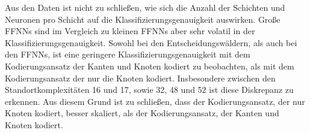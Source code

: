 Aus den Daten ist nicht zu schließen, wie sich die Anzahl der Schichten und Neuronen pro Schicht auf die Klassifizierungsgenauigkeit auswirken.
Große FFNNs sind im Vergleich zu kleinen FFNNs aber sehr volatil in der Klassifizierungsgenauigkeit.
\newline
\newline
Sowohl bei den Entscheidungswäldern, als auch bei den FFNNs, ist eine geringere Klassifizierungsgenauigkeit mit dem Kodierungsansatz der Kanten und Knoten kodiert
zu beobachten, als mit dem Kodierungsansatz der nur die Knoten kodiert.
Insbesondere zwischen den Standortkomplexitäten 16 und 17, sowie 32, 48 und 52 ist diese Diskrepanz zu erkennen.
Aus diesem Grund ist zu schließen, dass der Kodierungsansatz, der nur Knoten kodiert, besser skaliert, als der Kodierungsansatz, der Kanten und Knoten kodiert.